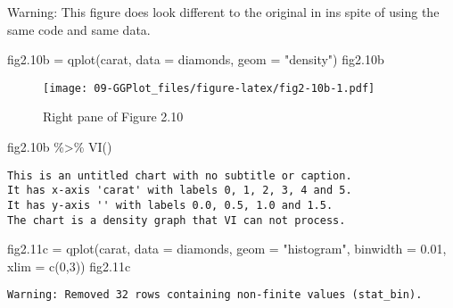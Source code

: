 \documentclass[
]{book}
\newenvironment{Shaded}{\begin{snugshade}}{\end{snugshade}}
\newcommand{\AttributeTok}[1]{\textcolor[rgb]{0.77,0.63,0.00}{#1}}
\newcommand{\DecValTok}[1]{\textcolor[rgb]{0.00,0.00,0.81}{#1}}
\newcommand{\FloatTok}[1]{\textcolor[rgb]{0.00,0.00,0.81}{#1}}
\newcommand{\FunctionTok}[1]{\textcolor[rgb]{0.00,0.00,0.00}{#1}}
\newcommand{\NormalTok}[1]{#1}
\newcommand{\OtherTok}[1]{\textcolor[rgb]{0.56,0.35,0.01}{#1}}
\newcommand{\SpecialCharTok}[1]{\textcolor[rgb]{0.00,0.00,0.00}{#1}}
\newcommand{\StringTok}[1]{\textcolor[rgb]{0.31,0.60,0.02}{#1}}
\begin{document}
Warning: This figure does look different to the original in \citet{Wickham2009ggplot2} ins spite of using the same code and same data.

\begin{Shaded}
\begin{Highlighting}[]
\NormalTok{fig2}\FloatTok{.10}\NormalTok{b }\OtherTok{=} \FunctionTok{qplot}\NormalTok{(carat, }\AttributeTok{data =}\NormalTok{ diamonds, }\AttributeTok{geom =} \StringTok{"density"}\NormalTok{)    }
\NormalTok{fig2}\FloatTok{.10}\NormalTok{b}
\end{Highlighting}
\end{Shaded}

\begin{figure}
\centering
\texttt{[image: 09-GGPlot\_files/figure-latex/fig2-10b-1.pdf]}
\caption{\label{fig:fig2-10b}Right pane of Figure 2.10}
\end{figure}

\begin{Shaded}
\begin{Highlighting}[]
\NormalTok{fig2}\FloatTok{.10}\NormalTok{b }\SpecialCharTok{\%\textgreater{}\%} \FunctionTok{VI}\NormalTok{()   }
\end{Highlighting}
\end{Shaded}

\begin{verbatim}
This is an untitled chart with no subtitle or caption.
It has x-axis 'carat' with labels 0, 1, 2, 3, 4 and 5.
It has y-axis '' with labels 0.0, 0.5, 1.0 and 1.5.
The chart is a density graph that VI can not process.
\end{verbatim}

\begin{Shaded}
\begin{Highlighting}[]
\NormalTok{fig2}\FloatTok{.11}\NormalTok{c }\OtherTok{=} \FunctionTok{qplot}\NormalTok{(carat, }\AttributeTok{data =}\NormalTok{ diamonds, }\AttributeTok{geom =} \StringTok{"histogram"}\NormalTok{, }\AttributeTok{binwidth =} \FloatTok{0.01}\NormalTok{, }\AttributeTok{xlim =} \FunctionTok{c}\NormalTok{(}\DecValTok{0}\NormalTok{,}\DecValTok{3}\NormalTok{))    }
\NormalTok{fig2}\FloatTok{.11}\NormalTok{c}
\end{Highlighting}
\end{Shaded}

\begin{verbatim}
Warning: Removed 32 rows containing non-finite values (stat_bin).
\end{verbatim}
\end{document}
